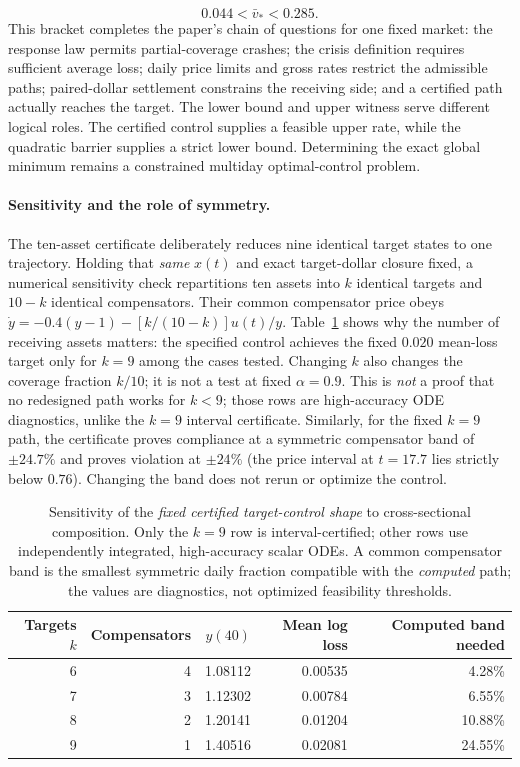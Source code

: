 \documentclass[11pt]{article}
\numberwithin{equation}{section}
\theoremstyle{definition}
\theoremstyle{remark}
\begin{document}
\begin{equation}\label{eq:v7-rate-bracket}
\boxed{\qquad 0.044<\bar v_*<0.285.\qquad}
\end{equation}
This bracket completes the paper's chain of questions for one fixed market: the response law permits partial-coverage crashes; the crisis definition requires sufficient average loss; daily price limits and gross rates restrict the admissible paths; paired-dollar settlement constrains the receiving side; and a certified path actually reaches the target. The lower bound and upper witness serve different logical roles. The certified control supplies a feasible upper rate, while the quadratic barrier supplies a strict lower bound. Determining the exact global minimum remains a constrained multiday optimal-control problem.
\paragraph{Sensitivity and the role of symmetry.}
The ten-asset certificate deliberately reduces nine identical target states to one trajectory. Holding that \emph{same} $x(t)$ and exact target-dollar closure fixed, a numerical sensitivity check repartitions ten assets into $k$ identical targets and $10-k$ identical compensators. Their common compensator price obeys $\dot y=-0.4(y-1)-[k/(10-k)]u(t)/y$. Table~\ref{tab:sensitivity} shows why the number of receiving assets matters: the specified control achieves the fixed $0.020$ mean-loss target only for $k=9$ among the cases tested. Changing $k$ also changes the coverage fraction $k/10$; it is not a test at fixed $\alpha=0.9$. This is \emph{not} a proof that no redesigned path works for $k<9$; those rows are high-accuracy ODE diagnostics, unlike the $k=9$ interval certificate. Similarly, for the fixed $k=9$ path, the certificate proves compliance at a symmetric compensator band of $\pm24.7\%$ and proves violation at $\pm24\%$ (the price interval at $t=17.7$ lies strictly below $0.76$). Changing the band does not rerun or optimize the control.
\begin{table}[H]\centering\small
\caption{Sensitivity of the \emph{fixed certified target-control shape} to cross-sectional composition. Only the $k=9$ row is interval-certified; other rows use independently integrated, high-accuracy scalar ODEs. A common compensator band is the smallest symmetric daily fraction compatible with the \emph{computed} path; the values are diagnostics, not optimized feasibility thresholds.}\label{tab:sensitivity}
\begin{tabular}{@{}rrrrr@{}}\toprule
Targets $k$ & Compensators & $y(40)$ & Mean log loss & Computed band needed \\\midrule
6 & 4 & 1.08112 & 0.00535 & 4.28\%\\
7 & 3 & 1.12302 & 0.00784 & 6.55\%\\
8 & 2 & 1.20141 & 0.01204 & 10.88\%\\
9 & 1 & 1.40516 & 0.02081 & 24.55\%\\
\bottomrule\end{tabular}
\end{table}
\end{document}
